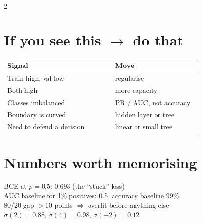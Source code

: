 \documentclass[11pt,a4paper]{article}
\newcommand{\sect}[1]{\section*{#1}}
\begin{document}
\begin{multicols}{2}
\sect{If you see this $\rightarrow$ do that}
\begin{tabular}{@{}p{0.52\linewidth}p{0.42\linewidth}@{}}
\toprule
Signal & Move\\
\midrule
Train high, val low & regularise\\
Both high & more capacity\\
Classes imbalanced & PR / AUC, not accuracy\\
Boundary is curved & hidden layer or tree\\
Need to defend a decision & linear or small tree\\
\bottomrule
\end{tabular}


\sect{Numbers worth memorising}
BCE at $p=0.5$: $0.693$ (the ``stuck'' loss)\\
AUC baseline for 1\% positives: 0.5, accuracy baseline 99\%\\
80/20 gap $>10$ points $\Rightarrow$ overfit before anything else\\
$\sigma(2)=0.88$, $\sigma(4)=0.98$, $\sigma(-2)=0.12$

\end{multicols}
\end{document}
